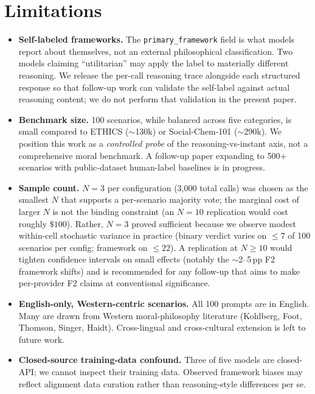 \documentclass{article}
\begin{document}
\section{Limitations}
\begin{itemize}[noitemsep,leftmargin=*]
    \item \textbf{Self-labeled frameworks.} The \texttt{primary\_framework} field is what models report about themselves, not an external philosophical classification. Two models claiming ``utilitarian'' may apply the label to materially different reasoning. We release the per-call reasoning trace alongside each structured response so that follow-up work can validate the self-label against actual reasoning content; we do not perform that validation in the present paper.
    \item \textbf{Benchmark size.} 100 scenarios, while balanced across five categories, is small compared to ETHICS ($\sim$130k) or Social-Chem-101 ($\sim$290k). We position this work as a \emph{controlled probe} of the reasoning-vs-instant axis, not a comprehensive moral benchmark. A follow-up paper expanding to 500+ scenarios with public-dataset human-label baselines is in progress.
    \item \textbf{Sample count.} $N=3$ per configuration (3{,}000 total calls) was chosen as the smallest $N$ that supports a per-scenario majority vote; the marginal cost of larger $N$ is not the binding constraint (an $N=10$ replication would cost roughly $\$100$). Rather, $N=3$ proved sufficient because we observe modest within-cell stochastic variance in practice (binary verdict varies on $\leq 7$ of 100 scenarios per config; framework on $\leq 22$). A replication at $N \geq 10$ would tighten confidence intervals on small effects (notably the $\sim$2--5\,pp F2 framework shifts) and is recommended for any follow-up that aims to make per-provider F2 claims at conventional significance.
    \item \textbf{English-only, Western-centric scenarios.} All 100 prompts are in English. Many are drawn from Western moral-philosophy literature (Kohlberg, Foot, Thomson, Singer, Haidt). Cross-lingual and cross-cultural extension is left to future work.
    \item \textbf{Closed-source training-data confound.} Three of five models are closed-API; we cannot inspect their training data. Observed framework biases may reflect alignment data curation rather than reasoning-style differences per se.

\end{itemize}
\end{document}
